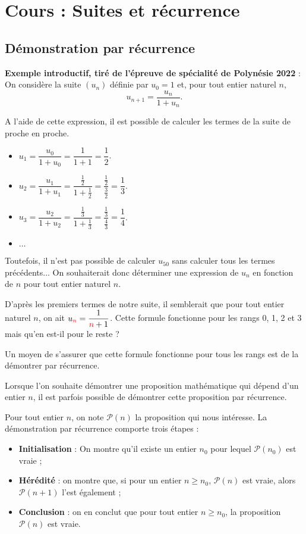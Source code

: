 \documentclass[11pt,fleqn]{book} %
\begin{document}
\chapter{Cours : Suites et récurrence}

\section{Démonstration par récurrence}

\textbf{Exemple introductif, tiré de l'épreuve de spécialité de Polynésie 2022} : On considère la suite \((u_n)\) définie par \(u_0=1\) et, pour tout entier naturel \(n\), \[u_{n+1}=\dfrac{u_n}{1+u_n}.\]

A l'aide de cette expression, il est possible de calculer les termes de la suite de proche en proche.
\begin{itemize}
\item \(u_1 = \dfrac{u_0}{1+u_0}=\dfrac{1}{1+1}=\dfrac{1}{2}\).
\vskip5pt
\item \(u_2= \dfrac{u_1}{1+u_1}=\dfrac{ \frac{1}{2}}{1+\frac{1}{2}}=\dfrac{ \frac{1}{2}}{\frac{3}{2}}=\dfrac{1}{3} \).
\vskip5pt
\item \(u_3= \dfrac{u_2}{1+u_2}=\dfrac{ \frac{1}{3}}{1+\frac{1}{3}}=\dfrac{ \frac{1}{3}}{\frac{4}{3}}=\dfrac{1}{4} \).
\vskip5pt
\item \(\ldots\)
\end{itemize}

Toutefois, il n'est pas possible de calculer \(u_{50}\) sans calculer tous les termes précédents... On souhaiterait donc déterminer une expression de \(u_n\) en fonction de \(n\) pour tout entier naturel \(n\).

D'après les premiers termes de notre suite, il semblerait que pour tout entier naturel \(n\), on ait \(u_{\color{red}{n}}=\dfrac{1}{\color{red}n\color{black}+1}\). Cette formule fonctionne pour les rangs 0, 1, 2 et 3 mais qu'en est-il pour le reste ? 

Un moyen de s'assurer que cette formule fonctionne pour tous les rangs est de la démontrer par récurrence.

\begin{definition}Lorsque l'on souhaite démontrer une proposition mathématique qui dépend d'un entier $n$, il est parfois possible de démontrer cette proposition par récurrence.

Pour tout entier $n$, on note $\mathcal{P}(n)$ la proposition qui nous intéresse. La démonstration par récurrence comporte trois étapes :
\begin{itemize}
\item \textbf{Initialisation} : On montre qu'il existe un entier $n_0$ pour lequel $\mathcal{P}(n_0)$ est vraie ;
\item \textbf{Hérédité} : on montre que, si pour un entier $n\geqslant n_0$, $\mathcal{P}(n)$ est vraie, alors $\mathcal{P}(n+1)$ l'est également ;
\item \textbf{Conclusion} : on en conclut que pour tout entier $n\geqslant n_0$, la proposition $\mathcal{P}(n)$ est vraie.
\end{itemize}\end{definition}
\end{document}
